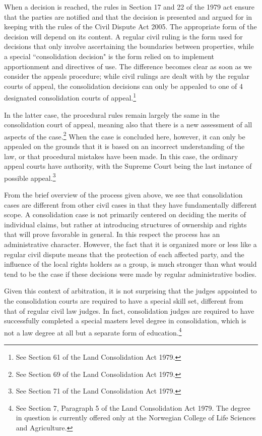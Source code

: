 When a decision is reached, the rules in Section 17 and 22 of the 1979 act ensure that the parties are notified and that the decision is presented and argued for in keeping with the rules of the Civil Dispute Act 2005. The appropriate form of the decision will depend on its content. A regular civil ruling is the form used for decisions that only involve ascertaining the boundaries between properties, while a special ``consolidation decision" is the form relied on to implement apportionment and directives of use. The difference becomes clear as soon as we consider the appeals procedure; while civil rulings are dealt with by the regular courts of appeal, the consolidation decisions can only be appealed to one of 4 designated consolidation courts of appeal.\footnote{See Section 61 of the Land Consolidation Act 1979.} 

In the latter case, the procedural rules remain largely the same in the consolidation court of appeal, meaning also that there is a new assessment of all aspects of the case.\footnote{See Section 69 of the Land Consolidation Act 1979.} When the case is concluded here, however, it can only be appealed on the grounds that it is based on an incorrect understanding of the law, or that procedural mistakes have been made. In this case, the ordinary appeal courts have authority, with the Supreme Court being the last instance of possible appeal.\footnote{See Section 71 of the Land Consolidation Act 1979.}

From the brief overview of the process given above, we see that consolidation cases are different from other civil cases in that they have fundamentally different scope. A consolidation case is not primarily centered on deciding the merits of individual claims, but rather at introducing structures of ownership and rights that will prove favorable in general. In this respect the process has an administrative character. However, the fact that it is organized more or less like a regular civil dispute means that the protection of each affected party, and the influence of the local rights holders as a group, is much stronger than what would tend to be the case if these decisions were made by regular administrative bodies.

Given this context of arbitration, it is not surprising that the judges appointed to the consolidation courts are required to have a special skill set, different from that of regular civil law judges. In fact, consolidation judges are required to have successfully completed a special masters level degree in consolidation, which is not a law degree at all but a separate form of education.\footnote{See Section 7, Paragraph 5 of the Land Consolidation Act 1979. The degree in question is currently offered only at the Norwegian College of Life Sciences and Agriculture.} 


